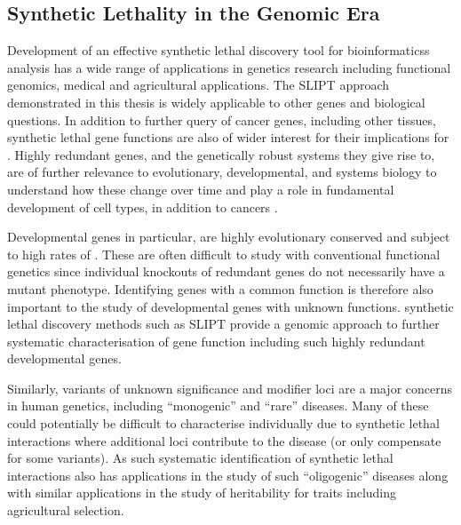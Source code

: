 \subsection{Synthetic Lethality in the Genomic Era}
\label{chapt6:significance_genetics}

Development of an effective \gls{synthetic lethal} discovery tool for \glspl{bioinformatics} analysis has a wide range of applications in genetics research including functional \glspl{genomic}, medical and agricultural applications.  The \gls{SLIPT} approach demonstrated in this thesis is widely applicable to other genes and biological questions. In addition to further query of cancer genes, including other tissues, \gls{synthetic lethal} gene functions are also of wider interest for their implications for . Highly redundant genes, and the genetically robust systems they give rise to, are of further relevance to evolutionary, developmental, and systems biology to understand how these change over time and play a role in fundamental development of cell types, in addition to cancers \citep{Nowak1997, Boone2007, Tischler2008}.

Developmental genes in particular, are highly evolutionary conserved and subject to high rates of  \citep{Nowak1997, Kockel1997,Fromental-Ramain1996}. These are often difficult to study with conventional functional genetics since individual knockouts of redundant genes do not necessarily have a \gls{mutant} phenotype. Identifying genes with a common function is therefore also important to the study of developmental genes with unknown functions. \Gls{synthetic lethal} discovery methods such as \gls{SLIPT} provide a \gls{genomic} approach to further systematic characterisation of gene function including such highly redundant developmental genes.

Similarly, variants of unknown significance and modifier loci are a major concerns in human genetics, including ``monogenic'' and ``rare'' diseases. Many of these could potentially be difficult to characterise individually due to \gls{synthetic lethal} interactions where additional loci contribute to the disease (or only compensate for some variants). As such systematic identification of \gls{synthetic lethal} interactions also has applications in the study of such ``oligogenic'' diseases along with similar applications in the study of heritability for traits including agricultural  selection.

